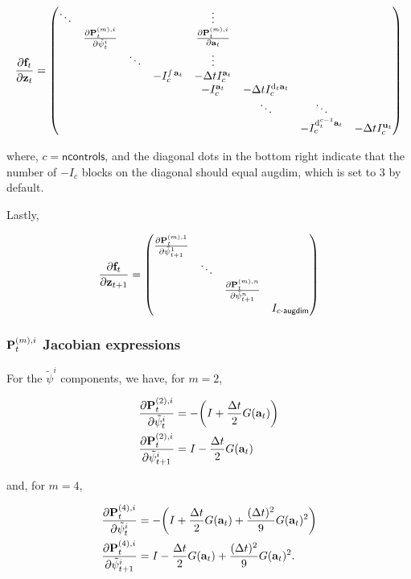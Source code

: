 \documentclass{article}
\newcommand{\isopsi}{\tilde \psi}
\begin{document}
\begin{equation}
  \pdv{\vb{f}_t}{\vb{z}_t} = \mqty(
    \ddots & & & & \vdots \\
    & \pdv{\vb{P}_t^{(m),i}}{\isopsi^i_t} & & & \pdv{\vb{P}_t^{(m),i}}{\vb{a}_t} \\
    & & \ddots & & \vdots \\ 
    & & & -I_{c}^{\smallint \vb{a}_t} & -\Delta t I_{c}^{\vb{a}_t} & \\
    & & & & -I_{c}^{\vb{a}_t} & -\Delta t I_{c}^{\dd_t\vb{a}_t} \\
    & & & & & \ddots & \ddots \\ 
    & & & & & & -I_{c}^{\dd_t^{c-1}\vb{a}_t} & -\Delta tI_{c}^{\vb{u}_t} \\ 
  )
\end{equation}

where, $c = \textsf{ncontrols}$, and the diagonal dots in the bottom right indicate that the number of $-I_c$ blocks on the diagonal should equal \textsf{augdim}, which is set to 3 by default.

\newpage

Lastly,

\begin{equation}
   \pdv{\vb{f}_t}{\vb{z}_{t+1}} = \mqty(
    \pdv{\vb{P}_t^{(m),1}}{\isopsi^1_{t+1}} & & & \\
    & \ddots & & \\
    & & \pdv{\vb{P}_t^{(m),n}}{\isopsi^n_{t+1}} & \\ 
    & & & I_{c \cdot \textsf{augdim}} \\
  )
\end{equation}

\subsubsection*{$\vb{P}^{(m),i}_t$ Jacobian expressions}

For the $\isopsi^i$ components, we have, for $m = 2$,

\begin{align}
  \pdv{\vb{P}_t^{(2),i}}{\isopsi^i_t} &= -\qty(I + \frac{\Delta t}{2}G(\vb{a}_t)) \\
  \pdv{\vb{P}_t^{(2),i}}{\isopsi^i_{t+1}} &= I - \frac{\Delta t}{2}G(\vb{a}_t)
\end{align}

and, for $m = 4$,

\begin{align}
  \pdv{\vb{P}_t^{(4),i}}{\isopsi^i_t} &= -\qty(I + \frac{\Delta t}{2}G(\vb{a}_t) + \frac{(\Delta t)^2}{9} G(\vb{a}_t)^2) \\
  \pdv{\vb{P}_t^{(4),i}}{\isopsi^i_{t+1}} &= I - \frac{\Delta t}{2}G(\vb{a}_t) + \frac{(\Delta t)^2}{9} G(\vb{a}_t)^2.
\end{align}
\end{document}
